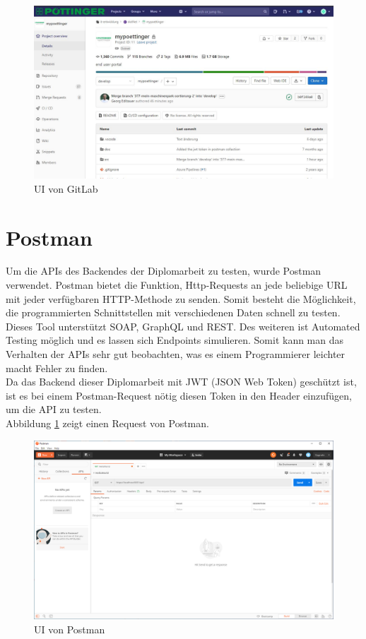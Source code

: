 \begin{figure}[H]
	\centerline{
		\includegraphics[width=1\textwidth, frame]{./grafiken/gitlab_startseite.JPG}
	}
	\vskip0pt
	\caption{UI von GitLab}
\end{figure}
\section{Postman}
Um die APIs des Backendes der Diplomarbeit zu testen, wurde Postman verwendet. Postman bietet die Funktion, Http-Requests an jede beliebige URL mit jeder verfügbaren HTTP-Methode zu senden. Somit besteht die Möglichkeit, die programmierten Schnittstellen mit verschiedenen Daten schnell zu testen. Dieses Tool unterstützt SOAP, GraphQL und REST. Des weiteren ist Automated Testing möglich und es lassen sich Endpoints simulieren. Somit kann man das Verhalten der APIs sehr gut beobachten, was es einem Programmierer leichter macht Fehler zu finden. \autocite{postmanDocs} \\
Da das Backend dieser Diplomarbeit mit JWT (JSON Web Token) geschützt ist, ist es bei einem Postman-Request nötig diesen Token in den Header einzufügen, um die API zu testen.  \\
Abbildung \ref{fig:postman} zeigt einen Request von Postman.
\begin{figure}[H]
	\centerline{
		\includegraphics[width=1\textwidth, frame]{./grafiken/postman.png}
	}
	\vskip0pt
	\caption{UI von Postman} \label{fig:postman}
\end{figure}


